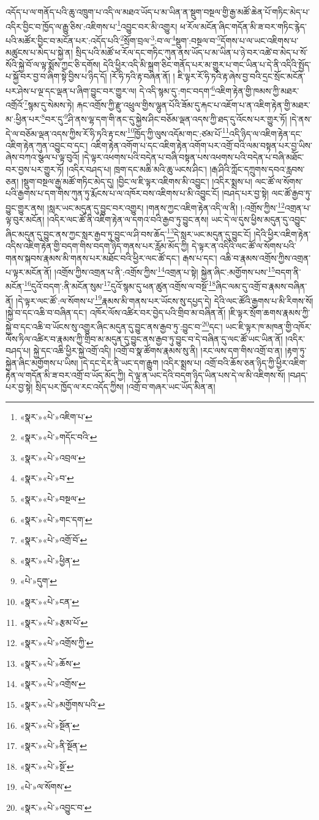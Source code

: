 འདོད་པ་ལ་གནོད་པའི་ཆུ་འཁྲུག་པ་འདི་ལ་མཐའ་ཡོད་པ་མ་ཡིན་ན་སྡུག་བསྔལ་གྱི་རྒྱ་མཚོ་ཆེན་པོ་གཏིང་མེད་པ་འདིར་བྱིང་བ་ཁྱོད་ལ་རྒྱུ་ཅིས་:འཇིགས་པ་\footnote{«སྣར་»«པེ་»འཇིག་པ་}འབྱུང་བར་མི་འགྱུར། ཕ་རོལ་མངོན་ཞིང་གདོན་མི་ཟ་བར་གཏིང་རྙེད་པའི་མཚོར་བྱིང་བ་མངོན་པར་:འདོད་པའི་\footnote{«སྣར་»«པེ་»གདོང་བའི་}སྲོག་བྲལ་\footnote{«སྣར་»«པེ་»འབྲལ་}:བ་ལ་\footnote{«སྣར་»«པེ་»བ་}སྡུག་:བསྔལ་བ་\footnote{«སྣར་»«པེ་»བསྔལ་}དོགས་པ་ལ་ཡང་འཇིགས་པ་མཚུངས་པ་མེད་པ་སྐྱེ་ན། སྲིད་པའི་མཚོ་ཕ་རོལ་དང་གཏིང་ཀུན་ནས་ཡོད་པ་མ་ཡིན་པ་ཉེ་བར་འཚེ་བ་མེད་པ་སོ་སོའི་སྐྱེ་བོ་ལ་ལྟ་སྨོས་ཀྱང་ཅི་དགོས། དེའི་ཕྱིར་འདི་མི་སྐྲག་ཅིང་གནོད་པར་མ་གྱུར་པ་གང་ཡིན་པ་དེ་ནི་འདིའི་སྤྱོད་པ་སྐྱོ་བར་བྱ་བ་ཞིག་སྟེ་བྱིས་པ་ཉིད་དོ། །རོ་ཧི་ཏའི་རྟ་བཞིན་ནོ། །
ཇི་ལྟར་རོ་ཧི་ཏའི་རྟ་ཞེས་བྱ་བའི་དྲང་སྲོང་མངོན་པར་ཤེས་པ་ལྔ་དང་ལྡན་པ་ཞིག་བྱུང་བར་གྱུར་ལ། དེ་འདི་སྙམ་དུ་:གང་བདག་\footnote{«སྣར་»«པེ་»གང་དག་}འཇིག་རྟེན་གྱི་ཁམས་ཀྱི་མཐར་འགྲོའོ་\footnote{«སྣར་»«པེ་»འགྲོ་བོ་}སྙམ་དུ་སེམས་ཏེ། རྐང་འགྲོས་ཀྱི་རྫུ་འཕྲུལ་གྱིས་ལྷུན་པོའི་ཟོམ་དུ་རྐང་པ་འཇོག་པ་ན་འཇིག་རྟེན་གྱི་མཐར་མ་:ཕྱིན་པར་\footnote{«སྣར་»«པེ་»ཕྱིན་}བར་དུ་\footnote{«པེ་»དུག་}ཤི་ནས་ལྷ་དག་གི་ནང་དུ་སྐྱེས་ཤིང་བཅོམ་ལྡན་འདས་ཀྱི་ཐད་དུ་འོངས་པར་གྱུར་ཏོ། །དེ་ནས་དེ་ལ་བཅོམ་ལྡན་འདས་ཀྱིས་རོ་ཧི་ཏའི་རྟ་ངས་\footnote{«སྣར་»«པེ་»ངན་}ཁྱོད་ཀྱི་ལུས་འདོམ་གང་:ཙམ་པོ་\footnote{«སྣར་»«པེ་»རྩམ་པོ་}འདི་ཉིད་ལ་འཇིག་རྟེན་དང་འཇིག་རྟེན་ཀུན་འབྱུང་བ་དང་། འཇིག་རྟེན་འགོག་པ་དང་འཇིག་རྟེན་འགོག་པར་འགྲོ་བའི་ལམ་བསྟན་པར་བྱ་ཡིས་ཞེས་བཀའ་སྩལ་པ་ལྟ་བུའོ། །དེ་ལྟར་འཕགས་པའི་བདེན་པ་བཞི་བསྟན་པས་འཕགས་པའི་བདེན་པ་བཞི་མཐོང་བར་བྱས་པར་གྱུར་ཏོ། །འདིར་བཤད་པ། ཁྲག་དང་མཆི་མའི་ཆུ་ཡངས་ཤིང་། །རྒ་ཤིའི་ཀློང་དཀྲུགས་དབའ་རླབས་ཅན། །སྡུག་བསྔལ་རྒྱ་མཚོ་གཏིང་མེད་དུ། །བྱིང་ལ་ཇི་ལྟར་འཇིགས་མི་འབྱུང་། །འདིར་སྨྲས་པ། ལང་ཚོ་ལ་སོགས་པའི་རྒྱགས་པ་དག་གིས་ཀུན་ཏུ་རྨོངས་པ་ལ་འཁོར་བས་འཇིགས་པ་མི་འབྱུང་ངོ། །བཤད་པར་བྱ་སྟེ། ལང་ཚོ་རྒྱབ་ཏུ་བྱུང་གྱུར་ནས། །སླར་ཡང་མདུན་དུ་བྱུང་བར་འགྱུར། །གནས་ཀྱང་འཇིག་རྟེན་འདི་ལ་ནི། །:འགྲོས་ཀྱིས་\footnote{«སྣར་»«པེ་»འགྲོས་ཀྱི་}འགྲན་པ་ལྟ་བུར་མངོན། །འདིར་ལང་ཚོ་ནི་འཇིག་རྟེན་ལ་དགའ་བའི་རྒྱབ་ཏུ་བྱུང་ནས། ཡང་དེ་ལ་དུས་ཕྱིས་མདུན་དུ་འབྱུང་ཞིང་མདུན་དུ་བྱུང་ནས་ཀྱང་སླར་རྒྱབ་ཏུ་བྱུང་ལ་ཤི་བས་ཆོད་\footnote{«སྣར་»«པེ་»ཆོས་}དེ་སླར་ཡང་མདུན་དུ་བྱུང་ངོ། །དེའི་ཕྱིར་འཇིག་རྟེན་འདིས་འཇིག་རྟེན་གྱི་བདག་གིས་བདག་ཉིད་གནས་པར་རློམ་མོད་ཀྱི། དེ་ལྟར་ན་འདིའི་ལང་ཚོ་ལ་སོགས་པའི་གནས་སྐབས་རྣམས་མི་གནས་པར་མཐོང་བའི་ཕྱིར་ལང་ཚོ་དང་། རྒས་པ་དང་། འཆི་བ་རྣམས་འགྲོས་ཀྱིས་འགྲན་པ་ལྟར་མངོན་ནོ། །འགྲོས་ཀྱིས་འགྲན་པ་ནི་:འགྲོས་ཀྱིས་\footnote{«སྣར་»«པེ་»འགྲོས་}འགྲན་པ་སྟེ། སྐྱེན་ཞིང་:མགྱོགས་པས་\footnote{«སྣར་»«པེ་»མགྱོགས་པའི་}བདག་ནི་མངོན་\footnote{«སྣར་»«པེ་»སྔོན་}དུའོ་བདག་:ནི་མངོན་སུམ་\footnote{«སྣར་»«པེ་»ནི་སྔོན་}དུའོ་སྙམ་དུ་ཕན་ཚུན་འགྲོས་ལ་བསྔོ་\footnote{«སྣར་»«པེ་»སྔོ་}ཞིང་ལམ་དུ་འགྲོ་བ་རྣམས་བཞིན་ནོ། །དེ་ལྟར་ལང་ཚོ་:ལ་སོགས་པ་\footnote{«པེ་»ལ་སོགས་}རྣམས་མི་གནས་པར་ཡོངས་སུ་དཔྱད་དེ། དེའི་ལང་ཚོའི་རྒྱགས་པ་མི་རིགས་སོ། །སྐྱེ་བ་དང་འཆི་བ་བཞིན་དང་། འཁོར་ལོས་འཚིར་བར་བྱེད་པའི་གྲིབ་མ་བཞིན་ནོ། །ཇི་ལྟར་སྲོག་ཆགས་རྣམས་ཀྱི་སྐྱེ་བ་དང་འཆི་བ་ཡོངས་སུ་འགྱུར་ཞིང་མདུན་དུ་བྱུང་ནས་རྒྱབ་ཏུ་:བྱུང་བ་\footnote{«སྣར་»«པེ་»འབྱུང་བ་}དང་། ཡང་ཇི་ལྟར་ཁ་མཁན་གྱི་འཁོར་ལོས་ཏིལ་འཚིར་བ་རྣམས་ཀྱི་གྲིབ་མ་མདུན་དུ་བྱུང་ནས་རྒྱབ་ཏུ་བྱུང་བ་དེ་བཞིན་དུ་ལང་ཚོ་ཡང་ཡིན་ནོ། །འདིར་བཤད་པ། སྐྱེ་དང་འཆི་ཕྱིར་སྐྱེ་འགྲོ་འདི། །འགྲོ་བ་སྣ་ཚོགས་རྣམས་སུ་ནི། །རང་ལས་དག་གིས་འགྲོ་བ་ན། །རྟག་ཏུ་སྐྱེན་ཞིང་མགྱོགས་པ་ཡིས། །དེ་དང་དེར་ནི་ཡང་དག་རྒྱུག །འདིར་སྨྲས་པ། འགྲོ་བའི་ཆོས་ཅན་ཉིད་ཀྱི་ཕྱིར་འཇིག་རྟེན་ལ་གདོན་མི་ཟ་བར་འགྲོ་བ་ཡོད་མོད་ཀྱི། དེ་ལྟ་ན་ཡང་དེའི་བདག་ཉིད་ཡིན་པས་དེ་ལ་མི་འཇིགས་སོ། །བཤད་པར་བྱ་སྟེ། སྲིད་པར་ཁྱོད་ལ་རང་འདོད་ཀྱིས། །འགྲོ་བ་གཞར་ཡང་ཡོད་མིན་ན། 
